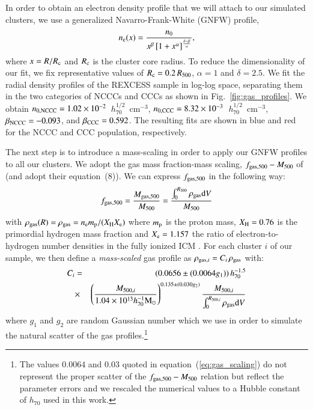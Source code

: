 \documentclass[useAMS,usenatbib]{mn2e}
\begin{document}
In order to obtain an electron density profile that we will attach to our
simulated clusters, we use a generalized Navarro-Frank-White (GNFW) profile,
\begin{equation}
n_{{\mathrm{e}}}(x) = \frac{n_{0}}{x^{\beta}\left[1+x^{\alpha}\right]^{\frac{\delta-\beta}{\alpha}}},
\label{eq:gnfw}
\end{equation}
where $x=R/R_{{\mathrm{c}}}$ and $R_{{\mathrm{c}}}$ is the cluster core radius. To reduce
the dimensionality of our fit, we fix representative values of $R_{{\mathrm{c}}} =
0.2\, R_{500}$, $\alpha = 1$ and $\delta = 2.5$. We fit the radial density
profiles of the REXCESS sample in log-log space, separating them in the two
categories of NCCCs and CCCs as shown in Fig.~\ref{fig:gas_profiles}.  We
obtain $n_{{\mathrm{0,NCCC}}} = 1.02\times10^{-2}$~$h_{70}^{1/2}$~cm$^{-3}$,
$n_{{\mathrm{0,CCC}}} = 8.32\times10^{-3}$~$h_{70}^{1/2}$~cm$^{-3}$,
$\beta_{{\mathrm{NCCC}}} = -0.093$, and $\beta_{{\mathrm{CCC}}} = 0.592$. The resulting
fits are shown in blue and red for the NCCC and CCC population, respectively.

The next step is to introduce a mass-scaling in order to apply our GNFW profiles
to all our clusters. We adopt the gas mass fraction-mass scaling,
$f_{{\mathrm{gas}},500}-M_{500}$ of \cite{2009ApJ...693.1142S} (and adopt their equation~(8)). We can
express $f_{{\mathrm{gas}},500}$ in the following way:
\begin{equation}
f_{{\mathrm{gas}},500} = \frac{M_{{\mathrm{gas}},500}}{M_{500}}  = \frac{\int_{0}^{R_{500}} \rho_{{\mathrm{gas}}} {\mathrm{d}}V}{M_{500}}
\label{eq:m500}
\end{equation}
with $\rho_{{\mathrm{gas}}}(R) = \rho_{{\mathrm{gas}}} = n_{{\mathrm{e}}} m_{{\mathrm{p}}} / ( X_{{\mathrm{H}}}X_{{\mathrm{e}}} )$ where
$m_{{\mathrm{p}}}$ is the proton mass, $X_{{\mathrm{H}}} = 0.76$ is the primordial hydrogen
mass fraction and $X_{{\mathrm{e}}} = 1.157$ the ratio of electron-to-hydrogen number
densities in the fully ionized ICM \citep{1988xrec.book.....S}. For each cluster
$i$ of our sample, we then define a \emph{mass-scaled} gas profile as
$\rho_{{\mathrm{gas}},i}=C_{i} \,\rho_{{\mathrm{gas}}}$ with:
\begin{eqnarray}
C_{i}  & = &  (0.0656\pm(0.0064g_{1})) \, h_{70}^{-1.5}  \nonumber \\
 & \times & \left(\frac{M_{500,i}}{1.04 \times 10^{13} h_{70}^{-1} {\mathrm{M_{\odot}}}}\right)^{0.135\pm(0.030g_{2})} \frac{M_{500,i}}{\int_{0}^{R_{500,i}} \rho_{{\mathrm{gas}}} {\mathrm{d}}V}
\label{eq:gas_scaling}
\end{eqnarray}
where $g_{1}$ and $g_{2}$ are random Gaussian number which we use in order to
simulate the natural scatter of the gas profiles.\footnote{The values
  $0.0064$ and $0.03$ quoted in equation~(\ref{eq:gas_scaling}) do not represent
  the proper scatter of the $f_{{\mathrm{gas}},500}-M_{500}$ relation but reflect the
  parameter errors and we rescaled the numerical values to a Hubble constant of
  $h_{70}$ used in this work.}
\end{document}
